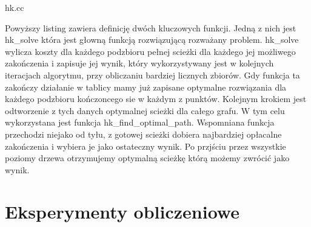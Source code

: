 \documentclass[polish,polish,a4paper]{article}
\begin{document}

{hk.cc}

Powyższy listing zawiera definicję dwóch kluczowych funkcji. Jedną z nich jest hk\_solve która jest głowną funkcją rozwiązującą rozważany problem.
hk\_solve wylicza koszty dla każdego podzbioru pełnej scieżki dla każdego jej możliwego zakończenia i zapisuje jej wynik, który wykorzystywany jest w kolejnych iteracjach algorytmu,
przy obliczaniu bardziej licznych zbiorów. Gdy funkcja ta zakończy działanie w tablicy mamy już zapisane optymalne rozwiązania dla każdego podzbioru kończoncego sie w każdym z punktów.
Kolejnym krokiem jest odtworzenie z tych danych optymalnej scieżki dla całego grafu. W tym celu wykorzystana jest funkcja hk\_find\_optimal\_path.
Wspomniana funkcja przechodzi niejako od tyłu, z gotowej scieżki dobiera najbardziej opłacalne zakończenia i wybiera je jako ostateczny wynik. Po przjściu przez wszystkie poziomy
drzewa otrzymujemy optymalną scieżkę którą możemy zwrócić jako wynik.

\section{Eksperymenty obliczeniowe}
\end{document}

